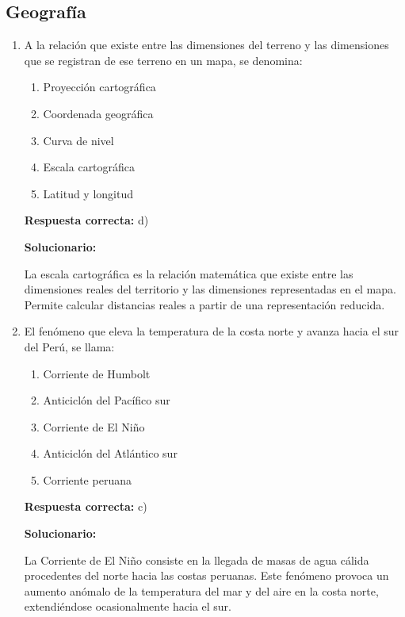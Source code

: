 \vspace{6mm}



\subsection*{Geografía}

\begin{enumerate}[resume]
	
\item A la relación que existe entre las dimensiones del terreno y las dimensiones que se registran de ese terreno en un mapa, se denomina:

\begin{enumerate}[label=\alph*)]
	\item Proyección cartográfica
	\item Coordenada geográfica
	\item Curva de nivel
	\item Escala cartográfica
	\item Latitud y longitud
\end{enumerate}

\textbf{Respuesta correcta:} d)

\vspace{2mm}
\textbf{Solucionario:}

La escala cartográfica es la relación matemática que existe entre las dimensiones reales del territorio y las dimensiones representadas en el mapa. Permite calcular distancias reales a partir de una representación reducida.

\vspace{6mm}

\item El fenómeno que eleva la temperatura de la costa norte y avanza hacia el sur del Perú, se llama:

\begin{enumerate}[label=\alph*)]
	\item Corriente de Humbolt
	\item Anticiclón del Pacífico sur
	\item Corriente de El Niño
	\item Anticiclón del Atlántico sur
	\item Corriente peruana
\end{enumerate}

\textbf{Respuesta correcta:} c)

\vspace{2mm}
\textbf{Solucionario:}

La Corriente de El Niño consiste en la llegada de masas de agua cálida procedentes del norte hacia las costas peruanas. Este fenómeno provoca un aumento anómalo de la temperatura del mar y del aire en la costa norte, extendiéndose ocasionalmente hacia el sur.

\vspace{6mm}	
	
\end{enumerate}


